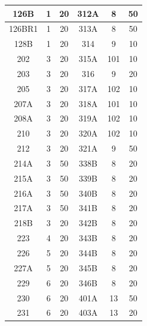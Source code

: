 \begin{table}[p]
\begin{center}
\begin{tabular}{|c|c|c||c|c|c|}
126B    &   1      &  20              & 312A    &   8      &  50           \\ \hline
126BR1  &   1      &  20              & 313A    &   8      &  50           \\ \hline
128B    &   1      &  20              & 314     &   9      &  10           \\ \hline
202     &   3      &  20              & 315A    &   101    &  10           \\ \hline
203     &   3      &  20              & 316     &   9      &  20           \\ \hline
205     &   3      &  20              & 317A    &   102    &  10           \\ \hline
207A    &   3      &  20              & 318A    &   101    &  10           \\ \hline
208A    &   3      &  20              & 319A    &   102    &  10           \\ \hline
210     &   3      &  20              & 320A    &   102    &  10           \\ \hline
212     &   3      &  20              & 321A    &   9      &  50           \\ \hline
214A    &   3      &  50              & 338B    &   8      &  20           \\ \hline
215A    &   3      &  50              & 339B    &   8      &  20           \\ \hline
216A    &   3      &  50              & 340B    &   8      &  20           \\ \hline
217A    &   3      &  50              & 341B    &   8      &  20           \\ \hline
218B    &   3      &  20              & 342B    &   8      &  20           \\ \hline
223     &   4      &  20              & 343B    &   8      &  20           \\ \hline
226     &   5      &  20              & 344B    &   8      &  20           \\ \hline
227A    &   5      &  20              & 345B    &   8      &  20           \\ \hline
229     &   6      &  20              & 346B    &   8      &  20           \\ \hline
230     &   6      &  20              & 401A    &   13     &  50           \\ \hline
231     &   6      &  20              & 403A    &   13     &  20           \\ \hline

\end{tabular}
\end{center}
\end{table}
